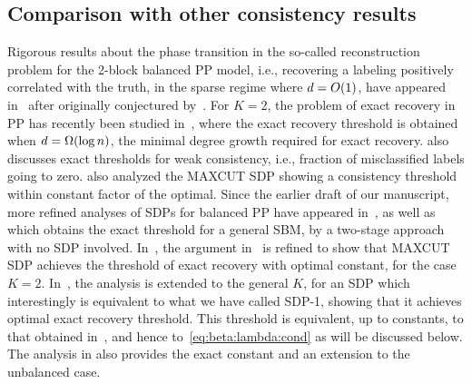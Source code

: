 \subsection{Comparison with other consistency results}
Rigorous results about the phase transition in the so-called reconstruction problem for the 2-block balanced PP model, i.e., recovering a labeling positively correlated with the truth, in the sparse regime where $d = O(1)$, have appeared in~\cite{Mossel.et.al.2012,Mossel2013,Massoulie2013} after originally conjectured by~\cite{Decelle2011}. For $K=2$, the problem of exact recovery in PP has recently been studied in~\cite{Abbe2014,Mossel2014}, where the exact recovery threshold is obtained when $d = \Omega(\log n)$, the minimal degree growth required for exact recovery. \cite{Mossel2014} also discusses exact thresholds for weak consistency, i.e., fraction of misclassified labels going to zero. \cite{Abbe2014} also analyzed the MAXCUT SDP showing a consistency threshold within constant factor of the optimal. Since the earlier draft of our manuscript, more refined analyses of SDPs for balanced PP have appeared in~\cite{Hajek2014,Hajek2015}, as well as~\cite{Abbe2015} which obtains the exact threshold for a general SBM, by a two-stage approach with no SDP involved. In~\cite{Hajek2014}, the argument in~\cite{Abbe2014} is refined to show that MAXCUT SDP achieves the threshold of exact recovery with optimal constant, for the case $K=2$. In~\cite{Hajek2015}, the analysis is extended to the general $K$, for an SDP which interestingly is equivalent to what we have called SDP-1, showing that it achieves optimal exact recovery threshold. This threshold is equivalent, up to constants, to that obtained in~\cite{Chen2014}, and hence to~\eqref{eq:beta:lambda:cond} as will be discussed below. The analysis in \cite{Hajek2015} also provides the exact constant and an extension to the unbalanced case. 

